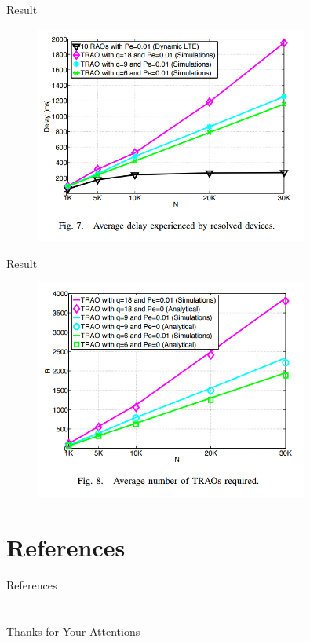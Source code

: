 \documentclass{beamer}
\begin{document}
\begin{frame}{Result}
    \begin{figure}[t]
        \centering
        \includegraphics[width=0.8\textwidth]{figures/g.png}
    \end{figure}
\end{frame}
\begin{frame}{Result}
    \begin{figure}[t]
        \centering
        \includegraphics[width=0.8\textwidth]{figures/h.png}
    \end{figure}
\end{frame}
\section{References}
\calcreferencespagetotal %
\begin{frame}[allowframebreaks]{References}
    \fontsize{9pt}{13}\selectfont
    
    
\end{frame}

\section{}

\begin{frame}
    \centering
    \Large{Thanks for Your Attentions}
\end{frame}
\end{document}
